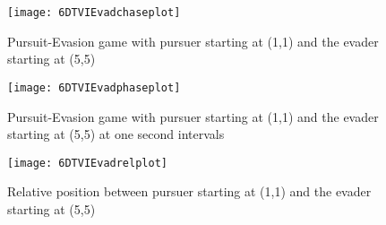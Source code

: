 \begin{figure}
\vspace{2.4in}
\centering
\texttt{[image: 6DTVIEvadchaseplot]}
\caption{Pursuit-Evasion game with pursuer starting at (1,1) and the evader starting at (5,5)}
\label{6DTVIEvadchaseplot}
\end{figure}
\clearpage
\newpage

\begin{figure}
\vspace{2.4in}
\centering
\texttt{[image: 6DTVIEvadphaseplot]}
\caption{Pursuit-Evasion game with pursuer starting at (1,1) and the evader starting at (5,5) at one second intervals}
\label{6DTVIEvadphaseplot}
\end{figure}
\clearpage
\newpage

\begin{figure}
\vspace{2.4in}
\centering
\texttt{[image: 6DTVIEvadrelplot]}
\caption{Relative position between pursuer starting at (1,1) and the evader starting at (5,5)}
\label{6DTVIEvadrelplot}
\end{figure}
\clearpage
\newpage